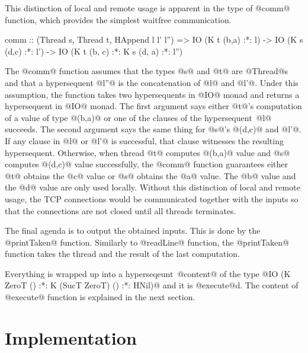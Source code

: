 \documentclass[doctor]{iscs-thesis}
\begin{document}
This distinction of local and remote usage is apparent in the type of
@comm@ function, which provides the simplest waitfree communication.
\begin{spec}
comm :: (Thread s, Thread t, HAppend l l' l'') =>
         IO (K t (b,a) :*: l)
         -> IO (K s (d,c) :*: l')
         -> IO (K t (b, c) :*: K s (d, a) :*: l'')
\end{spec}
The @comm@ function assumes that the types @s@ and @t@ are @Thread@s and
that a hypersequent @l''@ is the concatenation of @l@ and @l'@.
Under this assumption, the function takes two hypersequents in @IO@
monad and returns
a hypersequent in @IO@ monad.
The first argument says either @t@'s computation of a value of type
@(b,a)@ or one of the clauses of the hypersequent~@l@ succeeds.
The second argument says the same thing for @s@'s @(d,c)@ and @l'@.
If any clause in @l@ or @l'@ is successful, that clause witnesses the
resulting hypersequent.  Otherwise, when 
thread @t@
computes @(b,a)@ value and
@s@ computes @(d,c)@ value successfully, the @comm@ function guarantees either
@t@ obtains the @c@ value or @s@ obtains the @a@ value.  The @b@ value
and the @d@ value are only used locally.  Without this distinction of
local and remote usage, the TCP connections would be communicated
together with the inputs so that the connections are not closed until all
threads terminates.

The final agenda is to output the obtained inputs.  This is done by the
@printTaken@ function.
Similarly to @readLine@ function, the @printTaken@ function takes the
thread and the result of the last computation.

Everything is wrapped up into a hyperseqeunt~@content@ of the type
@IO (K ZeroT () :*: K (SucT ZeroT) () :*: HNil)@
and it is @execute@d.  The content of @execute@ function is explained in
the next section.

\section{Implementation}
\end{document}
